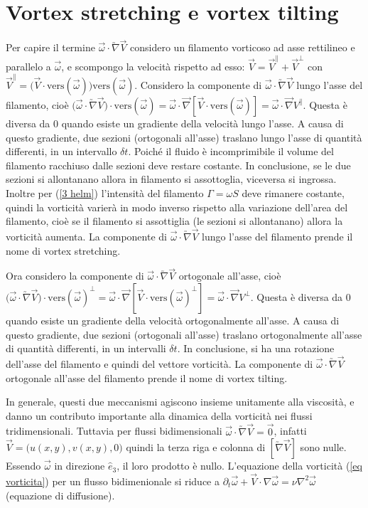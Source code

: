 \documentclass[11pt,a4paper]{report}
\begin{document}
	\section{Vortex stretching e vortex tilting}	\label{vortex}
	Per capire il termine $\vec\omega\cdot\utilde\nabla\vec V$ considero un filamento vorticoso ad asse rettilineo e parallelo a $\vec\omega$, e scompongo la velocità rispetto ad esso: $\vec V=\vec V^\parallel+\vec V^\perp$ con $\vec V^\parallel=\big(\vec V\cdot\mathrm{vers}(\vec\omega)\big)\mathrm{vers}(\vec\omega)$. Considero la componente di $\vec\omega\cdot\utilde\nabla\vec V$ lungo l'asse del filamento, cioè $\big(\vec\omega\cdot\utilde\nabla\vec V\big)\cdot\mathrm{vers}(\vec\omega)=\vec\omega\cdot\vec\nabla[\vec V\cdot\mathrm{vers}(\vec\omega)]=\vec\omega\cdot\vec\nabla V^\parallel$. Questa è diversa da $0$ quando esiste un gradiente della velocità lungo l'asse. A causa di questo gradiente, due sezioni (ortogonali all'asse) traslano lungo l'asse di quantità differenti, in un intervallo $\delta t$. Poiché il fluido è incomprimibile il volume del filamento racchiuso dalle sezioni deve restare costante. In conclusione, se le due sezioni si allontanano allora in filamento si assottoglia, viceversa si ingrossa.\\Inoltre per (\ref{3 helm}) l'intensità del filamento $\Gamma=\omega S$ deve rimanere costante, quindi la vorticità varierà in modo inverso rispetto alla variazione dell'area del filamento, cioè se il filamento si assottiglia (le sezioni si allontanano) allora la vorticità aumenta. La componente di $\vec\omega\cdot\utilde\nabla\vec V$ lungo l'asse del filamento prende il nome di vortex stretching.
	
	Ora considero la componente di $\vec\omega\cdot\utilde\nabla\vec V$ ortogonale all'asse, cioè $\big(\vec\omega\cdot\utilde\nabla\vec V\big)\cdot\mathrm{vers}(\vec\omega)^\perp=\vec\omega\cdot\vec\nabla[\vec V\cdot\mathrm{vers}(\vec\omega)^\perp]=\vec\omega\cdot\vec\nabla V^\perp$. Questa è diversa da 0 quando esiste un gradiente della velocità ortogonalmente all'asse. A causa di questo gradiente, due sezioni (ortogonali all'asse) traslano ortogonalmente all'asse di quantità differenti, in un intervalli $\delta t$. In conclusione, si ha una rotazione dell'asse del filamento e quindi del vettore vorticità. La componente di $\vec\omega\cdot\utilde\nabla\vec V$ ortogonale all'asse del filamento prende il nome di vortex tilting.
	
	In generale, questi due meccanismi agiscono insieme unitamente alla viscosità, e danno un contributo importante alla dinamica della vorticità nei flussi tridimensionali. Tuttavia per flussi bidimensionali $\vec\omega\cdot\utilde\nabla\vec V=\vec 0$, infatti $\vec V=\big(u(x,y),v(x,y),0\big)$ quindi la terza riga e colonna di $[\utilde\nabla\vec V]$ sono nulle. Essendo $\vec\omega$ in direzione $\hat e_3$, il loro prodotto è nullo. L'equazione della vorticità (\ref{eq vorticita}) per un flusso bidimenionale si riduce a $\partial_t\vec\omega+\vec V\cdot\nabla\vec\omega=\nu\nabla^2\vec\omega$ (equazione di diffusione).
	
\end{document}
